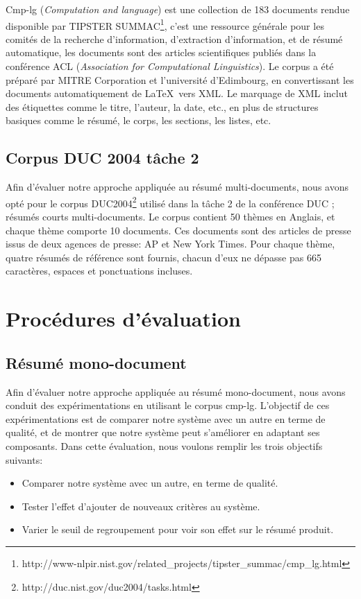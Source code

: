\documentclass[a4paper,12pt,oneside]{../use/ESIthesis}
\begin{document}
Cmp-lg (\textit{Computation and language}) est une collection de 183 documents rendue disponible par TIPSTER SUMMAC\footnote{http://www-nlpir.nist.gov/related\_projects/tipster\_summac/cmp\_lg.html}, c'est une ressource générale pour les comités de la recherche d'information, d'extraction d'information, et de résumé automatique, les documents sont des articles scientifiques publiés dans la conférence ACL (\textit{Association for Computational Linguistics}).
Le corpus a été préparé par MITRE Corporation et l'université d'Edimbourg, en convertissant les documents automatiquement de \LaTeX\ vers XML. 
Le marquage de XML inclut des étiquettes comme le titre, l'auteur, la date, etc., en plus de structures basiques comme le résumé, le corps, les sections, les listes, etc.

\subsection{Corpus DUC 2004 tâche 2}

Afin d'évaluer notre approche appliquée au résumé multi-documents, nous avons opté pour le corpus DUC2004\footnote{http://duc.nist.gov/duc2004/tasks.html} utilisé dans la tâche 2 de la conférence DUC ; résumés courts multi-documents. 
Le corpus contient 50 thèmes en Anglais, et chaque thème comporte 10 documents. 
Ces documents sont des articles de presse issus de deux agences de presse: AP et New York Times. 
Pour chaque thème, quatre résumés de référence sont fournis, chacun d'eux ne dépasse pas 665 caractères, espaces et ponctuations incluses.

\section{Procédures d'évaluation}

\subsection{Résumé mono-document}

Afin d'évaluer notre approche appliquée au résumé mono-document, nous avons conduit des expérimentations en utilisant le corpus cmp-lg. 
L'objectif de ces expérimentations est de comparer notre système avec un autre en terme de qualité, et de montrer que notre système peut s'améliorer en adaptant ses composants. 
Dans cette évaluation, nous voulons remplir les trois objectifs suivants: 
\begin{itemize}
\item Comparer notre système avec un autre, en terme de qualité. 
\item Tester l'effet d'ajouter de nouveaux critères au système. 
\item Varier le seuil de regroupement pour voir son effet sur le résumé produit.
\end{itemize}
\end{document}

